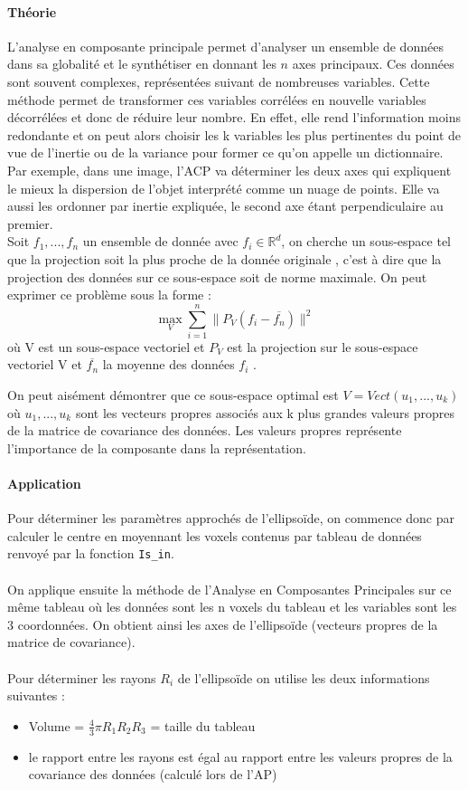\documentclass{article}
\begin{document}
\paragraph{Théorie} L'analyse en composante principale permet d'analyser un ensemble de données dans sa globalité et le synthétiser en donnant les $n$ axes principaux. Ces données sont souvent complexes, représentées suivant de nombreuses variables. Cette méthode permet de transformer ces variables corrélées en nouvelle variables décorrélées et donc de réduire leur nombre. En effet, elle rend l'information moins redondante et on peut alors choisir les k variables les plus pertinentes du point de vue de l'inertie ou de la variance pour former ce qu'on appelle un dictionnaire. \\
Par exemple, dans une image, l'ACP va déterminer les deux axes qui expliquent le mieux la dispersion de l'objet interprété comme un nuage de points. Elle va aussi les ordonner par inertie expliquée, le second axe étant perpendiculaire au premier.\\

Soit $f_1,...,f_n$  un ensemble de donnée avec $f_i \in \mathbb{R}^d$, on cherche un sous-espace tel que la projection soit la plus proche de la donnée originale , c'est à dire que la projection des données sur ce sous-espace soit de norme maximale. On peut exprimer ce problème sous la forme :
$$\max_V \sum_{i=1}^n \parallel P_V(f_i-\overline{f_n}) \parallel ^2$$
où V est un sous-espace vectoriel et $P_V$ est la projection sur le sous-espace vectoriel V et $\overline{f_n}$ la moyenne des données $f_i$ .

On peut aisément démontrer que ce sous-espace optimal est $V=Vect(u_1,..., u_k)$ où $u_1,..., u_k$ sont les vecteurs propres associés aux k plus grandes valeurs propres de la matrice de covariance des données. Les valeurs propres représente l'importance de la composante dans la représentation.


\paragraph{Application}

Pour déterminer les paramètres approchés de l'ellipsoïde, on commence donc par calculer le centre en moyennant les voxels contenus par tableau de données renvoyé par la fonction \texttt{Is\_in}. \\\\
On applique ensuite la méthode de l'Analyse en Composantes Principales sur ce même tableau où les données sont les n voxels du tableau et les variables sont les 3 coordonnées. On obtient ainsi les axes de l'ellipsoïde (vecteurs propres de la matrice de covariance).\\\\
Pour déterminer les rayons $R_i$ de l'ellipsoïde on utilise les deux informations suivantes :
\begin{itemize}
	\item Volume = $\frac{4}{3} \pi R_1R_2R_3$ = taille du tableau
	\item le rapport entre les rayons est égal au rapport entre les valeurs propres de la covariance des données (calculé lors de l'AP)
\end{itemize}
\end{document}
